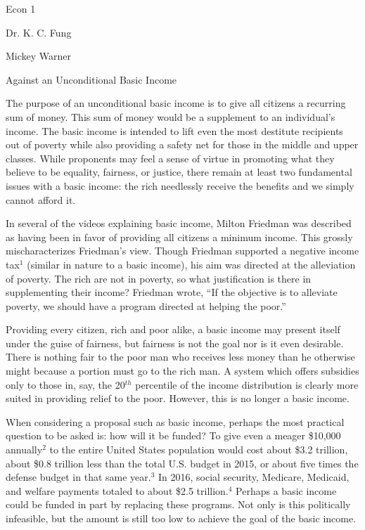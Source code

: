 \documentclass[12pt]{article}
\begin{document}
\noindent Econ 1

\noindent Dr. K. C. Fung
\bigskip

\noindent Mickey Warner

\begin{center}
Against an Unconditional Basic Income
\end{center}

The purpose of an unconditional basic income is to give all citizens a recurring sum of money. This sum of money would be a supplement to an individual's income. The basic income is intended to lift even the most destitute recipients out of poverty while also providing a safety net for those in the middle and upper classes. While proponents may feel a sense of virtue in promoting what they believe to be equality, fairness, or justice, there remain at least two fundamental issues with a basic income: the rich needlessly receive the benefits and we simply cannot afford it.

In several of the videos explaining basic income, Milton Friedman was described as having been in favor of providing all citizens a minimum income. This grossly mischaracterizes Friedman's view. Though Friedman supported a negative income tax$^1$ (similar in nature to a basic income), his aim was directed at the alleviation of poverty. The rich are not in poverty, so what justification is there in supplementing their income? Friedman wrote, ``If the objective is to alleviate poverty, we should have a program directed at helping the poor.''

Providing every citizen, rich and poor alike, a basic income may present itself under the guise of fairness, but fairness is not the goal nor is it even desirable. There is nothing fair to the poor man who receives less money than he otherwise might because a portion must go to the rich man. A system which offers subsidies only to those in, say, the 20$^{th}$ percentile of the income distribution is clearly more suited in providing relief to the poor. However, this is no longer a basic income.

When considering a proposal such as basic income, perhaps the most practical question to be asked is: how will it be funded? To give even a meager \$10,000 annually$^2$ to the entire United States population would cost about \$3.2 trillion, about \$0.8 trillion less than the total U.S. budget in 2015, or about five times the defense budget in that same year.$^3$ In 2016, social security, Medicare, Medicaid, and welfare payments totaled to about \$2.5 trillion.$^4$ Perhaps a basic income could be funded in part by replacing these programs. Not only is this politically infeasible, but the amount is still too low to achieve the goal of the basic income.
\end{document}
